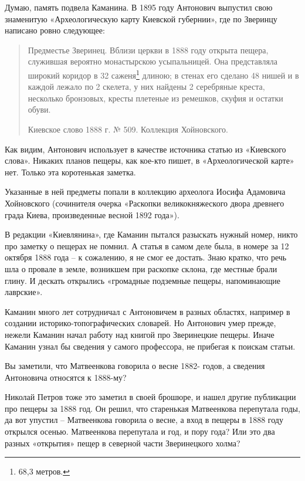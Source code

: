Думаю, память подвела Каманина. В 1895 году Антонович выпустил свою знаменитую «Археологическую карту Киевской губернии»\cite{antonovich01}, где по Зверинцу написано ровно следующее:

\begin{quotation}
Предместье Зверинец. Вблизи церкви в 1888 году открыта пещера, служившая вероятно монастырскою усыпальницей. Она представляла широкий коридор в 32 саженя\footnote{68,3 метров.} длиною; в стенах его сделано 48 нишей и в каждой лежало по 2 скелета, у них найдены 2 серебряные креста, несколько бронзовых, кресты плетеные из ремешков, скуфия и остатки обуви.

Киевское слово 1888 г. № 509. Коллекция Хойновского.
\end{quotation}

Как видим, Антонович использует в качестве источника статью из «Киевского слова». Никаких планов пещеры, как кое-кто пишет, в «Археологической карте» нет. Только эта коротенькая заметка.


Указанные в ней предметы попали в коллекцию археолога Иосифа Адамовича Хойновского (сочинителя очерка «Раскопки великокняжеского двора древнего града Киева, произведенные весной 1892 года»).

В редакции «Киевлянина», где Каманин пытался разы\-скать нужный номер, никто про заметку о пещерах не помнил. А статья в самом деле была, в номере за 12 октября 1888 года – к сожалению, я не смог ее достать. Знаю кратко, что речь шла о провале в земле, возникшем при раскопке склона, где местные брали глину. И дескать открылись «громадные подземные пещеры, напоминающие лаврские».

Каманин много лет сотрудничал с Антоновичем в разных областях, например в создании историко-топографи\-ческих словарей. Но Антонович умер прежде, нежели Каманин начал работу над книгой про Зверинецкие пещеры. Иначе Каманин узнал бы сведения у самого профессора, не прибегая к поискам статьи.

Вы заметили, что Матвеенкова говорила о весне 1882- годов, а сведения Антоновича относятся к 1888-му?

Николай Петров тоже это заметил в своей брошюре, и нашел другие публикации про пещеры за 1888 год. Он решил, что старенькая Матвеенкова перепутала годы, да вот упустил – Матвеенкова говорила о весне, а вход в пещеры в 1888 году открылся осенью. Матвеенкова перепутала и год, и пору года? Или это два разных «открытия» пещер в северной части Зверинецкого холма?

